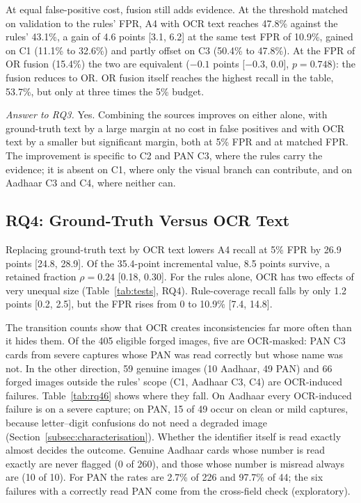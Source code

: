 \documentclass[conference]{IEEEtran}
\begin{document}
At equal false-positive cost, fusion still adds evidence. At the
threshold matched on validation to the rules' FPR, A4 with OCR text
reaches 47.8\% against the rules' 43.1\%, a gain of 4.6 points [3.1,
6.2] at the same test FPR of 10.9\%, gained on C1 (11.1\% to
32.6\%) and partly offset on C3 (50.4\% to 47.8\%). At the FPR of OR fusion (15.4\%) the two are equivalent
($-0.1$ points [$-0.3$, 0.0], $p=0.748$): the fusion reduces to OR. OR
fusion itself reaches the highest recall in the table, 53.7\%, but only
at three times the 5\% budget.

\emph{Answer to RQ3.} Yes. Combining the sources improves on either
alone, with ground-truth text by a large margin at no cost in false
positives and with OCR text by a smaller but significant margin, both
at 5\% FPR and at matched FPR. The improvement is specific to C2 and
PAN C3, where the rules carry the evidence; it is absent on C1, where
only the visual branch can contribute, and on Aadhaar C3 and C4, where
neither can.

\subsection{RQ4: Ground-Truth Versus OCR Text}
\label{subsec:res-rq4}

Replacing ground-truth text by OCR text lowers A4 recall at 5\% FPR by
26.9 points [24.8, 28.9]. Of the 35.4-point incremental value, 8.5
points survive, a retained fraction $\rho=0.24$ [0.18, 0.30]. For the
rules alone, OCR has two effects of very unequal size
(Table~\ref{tab:tests}, RQ4). Rule-coverage recall falls by only 1.2
points [0.2, 2.5], but the FPR rises from 0 to 10.9\% [7.4, 14.8].

The transition counts show that OCR creates inconsistencies far more
often than it hides them. Of the 405 eligible forged images, five are
OCR-masked: PAN C3 cards from severe captures whose PAN was read
correctly but whose name was not. In the other direction, 59 genuine
images (10 Aadhaar, 49 PAN) and 66 forged images outside the rules'
scope (C1, Aadhaar C3, C4) are OCR-induced failures. Table~\ref{tab:rq46} shows
where they fall. On Aadhaar every OCR-induced failure is on a severe
capture; on PAN, 15 of 49 occur on clean or mild captures, because
letter--digit confusions do not need a degraded image
(Section~\ref{subsec:characterisation}). Whether the identifier itself
is read exactly almost decides the outcome. Genuine Aadhaar cards whose
number is read exactly are never flagged (0 of 260), and those whose
number is misread always are (10 of 10). For PAN the rates are 2.7\% of
226 and 97.7\% of 44; the six failures with a correctly read PAN come
from the cross-field check (exploratory).
\end{document}
